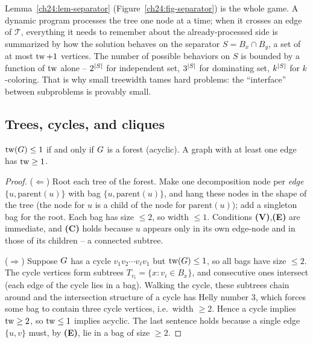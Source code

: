 \begin{whybox}
Lemma~\ref{ch24:lem-separator} (Figure~\ref{ch24:fig-separator}) is the whole
game. A dynamic program processes the
tree one node at a time; when it crosses an edge of $\mathcal{T}$, everything it
needs to remember about the already-processed side is summarized by how the
solution behaves on the separator $S=B_x\cap B_y$, a set of at most $\operatorname{tw}+1$
vertices. The number of possible behaviors on $S$ is bounded by a function of
$\operatorname{tw}$ alone -- $2^{\lvert S\rvert}$ for independent set, $3^{\lvert S\rvert}$ for dominating set,
$k^{\lvert S\rvert}$ for $k$-coloring. That is why small treewidth tames hard problems:
the ``interface'' between subproblems is provably small.
\end{whybox}

\subsection{Trees, cycles, and cliques}

\begin{proposition}
\label{ch24:prop-trees}
$\operatorname{tw}(G)\le 1$ if and only if $G$ is a forest (acyclic). A graph with at
least one edge has $\operatorname{tw}\ge 1$.
\end{proposition}

\begin{proof}
($\Leftarrow$) Root each tree of the forest. Make one decomposition node per
\emph{edge} $\{u,\mathrm{parent}(u)\}$ with bag $\{u,\mathrm{parent}(u)\}$, and
hang these nodes in the shape of the tree (the node for $u$ is a child of the node
for $\mathrm{parent}(u)$); add a singleton bag for the root. Each bag has size
$\le 2$, so width $\le 1$. Conditions \textbf{(V)},\textbf{(E)} are immediate, and
\textbf{(C)} holds because $u$ appears only in its own edge-node and in those of
its children -- a connected subtree.

($\Rightarrow$) Suppose $G$ has a cycle $v_1 v_2\cdots v_\ell v_1$ but
$\operatorname{tw}(G)\le 1$, so all bags have size $\le 2$. The cycle vertices form subtrees
$T_{v_i}=\{x:v_i\in B_x\}$, and consecutive ones intersect (each edge of the cycle
lies in a bag). Walking the cycle, these subtrees chain around and the
intersection structure of a cycle has Helly number $3$, which forces some bag to
contain three cycle vertices, i.e.\ width $\ge 2$. Hence a cycle implies
$\operatorname{tw}\ge 2$, so $\operatorname{tw}\le 1$ implies acyclic. The last sentence holds because a
single edge $\{u,v\}$ must, by \textbf{(E)}, lie in a bag of size $\ge 2$.
\end{proof}

